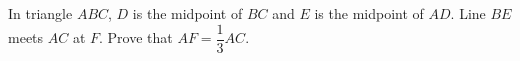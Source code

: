 In triangle $ABC$, $D$ is the midpoint of $BC$ and $E$ is the midpoint of $AD$. Line $BE$ meets $AC$ at $F$. Prove that $AF=\dfrac{1}{3}AC$.

